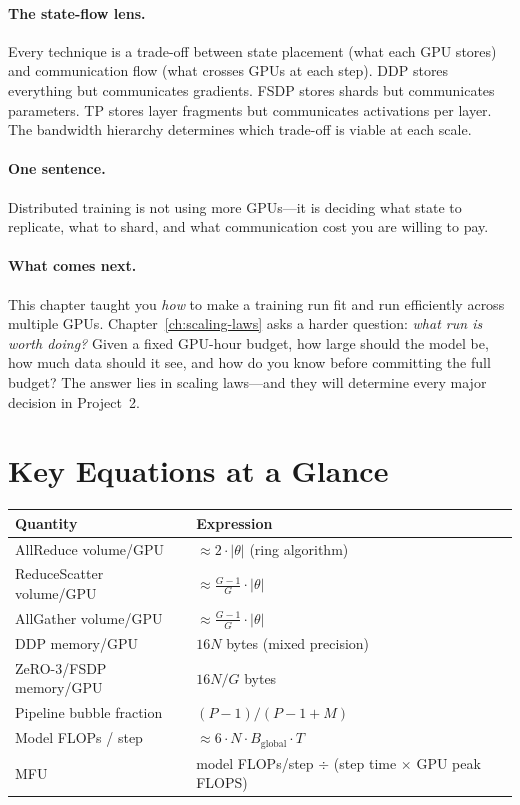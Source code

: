 \paragraph{The state-flow lens.} Every technique is a trade-off between state placement (what each GPU stores) and communication flow (what crosses GPUs at each step). DDP stores everything but communicates gradients. FSDP stores shards but communicates parameters. TP stores layer fragments but communicates activations per layer. The bandwidth hierarchy determines which trade-off is viable at each scale.

\paragraph{One sentence.} Distributed training is not using more GPUs---it is deciding what state to replicate, what to shard, and what communication cost you are willing to pay.

\paragraph{What comes next.} This chapter taught you \emph{how} to make a training run fit and run efficiently across multiple GPUs. Chapter~\ref{ch:scaling-laws} asks a harder question: \emph{what run is worth doing?} Given a fixed GPU-hour budget, how large should the model be, how much data should it see, and how do you know before committing the full budget? The answer lies in scaling laws---and they will determine every major decision in Project~2.


\section*{Key Equations at a Glance}

\begin{center}
\begin{tabularx}{\textwidth}{@{}p{4.5cm}X@{}}
\toprule
\textbf{Quantity} & \textbf{Expression} \\
\midrule
AllReduce volume/GPU & $\approx 2 \cdot |\theta|$ (ring algorithm) \\
ReduceScatter volume/GPU & $\approx \frac{G-1}{G} \cdot |\theta|$ \\
AllGather volume/GPU & $\approx \frac{G-1}{G} \cdot |\theta|$ \\
DDP memory/GPU & $16N$ bytes (mixed precision) \\
ZeRO-3/FSDP memory/GPU & $16N / G$ bytes \\
Pipeline bubble fraction & $(P-1) / (P-1 + M)$ \\
Model FLOPs / step & $\approx 6 \cdot N \cdot B_{\text{global}} \cdot T$ \\
MFU & model FLOPs/step $\div$ (step time $\times$ GPU peak FLOPS) \\
\bottomrule
\end{tabularx}
\end{center}


